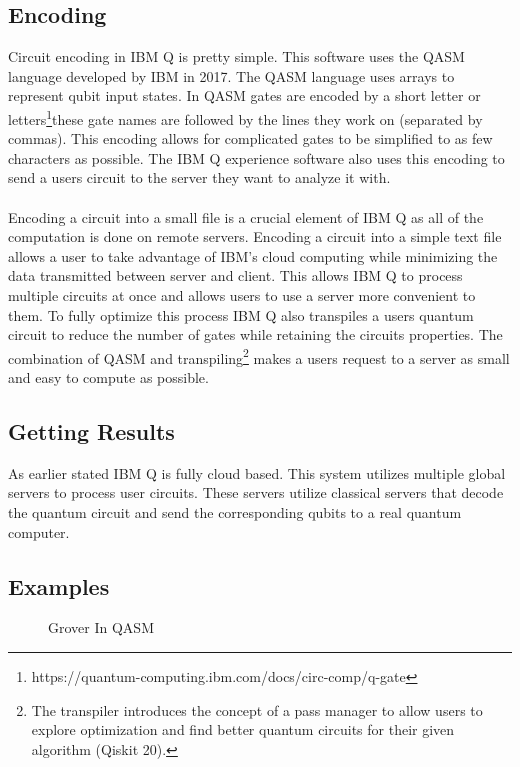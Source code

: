 \documentclass{article}
\newcommand{\url}{\footnote{https://quantum-computing.ibm.com/docs/circ-comp/q-gate}} %
\begin{document}
    \subsection{Encoding}
        Circuit encoding in IBM Q is pretty simple. This software uses the QASM language developed by IBM in 2017. The QASM language uses arrays to represent qubit input states. In QASM gates are encoded by a short letter or letters\url these gate names are followed by the lines they work on (separated by commas). This encoding allows for complicated gates to be simplified to as few characters as possible. The IBM Q experience software also uses this encoding to send a users circuit to the server they want to analyze it with.
        \\
         \smallskip
        \\
        Encoding a circuit into a small file is a crucial element of IBM Q as all of the computation is done on remote servers. Encoding a circuit into a simple text file allows a user to take advantage of IBM's cloud computing while minimizing the data transmitted between server and client. This allows IBM Q to process multiple circuits at once and allows users to use a server more convenient to them. To fully optimize this process IBM Q also transpiles a users quantum circuit to reduce the number of gates while retaining the circuits properties. The combination of QASM and transpiling\footnote{The transpiler introduces the concept of a pass manager to allow users to explore optimization and find better quantum circuits for their given algorithm (Qiskit 20).} makes a users request to a server as small and easy to compute as possible. 

    \subsection{Getting Results}
        As earlier stated IBM Q is fully cloud based. This system utilizes multiple global servers to process user circuits. These servers utilize classical servers that decode the quantum circuit and send the corresponding qubits to a real quantum computer.
    \subsection{Examples}
        \begin{figure}
                
            \caption{Grover In QASM}
        \end{figure}
\end{document}
